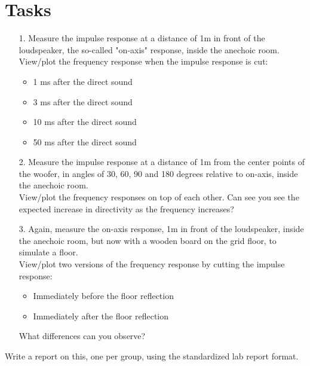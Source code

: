\documentclass{article}
\begin{document}
\section{Tasks}
\begin{itemize}
    \item [1.] Measure the impulse response at a distance of 1m in front of the loudspeaker, the so-called "on-axis" response, inside the anechoic room. \\
	View/plot the frequency response when the impulse response is cut:\\
    \begin{itemize}
	\item 1 ms after the direct sound
	\item 3 ms after the direct sound	
	\item 10 ms after the direct sound	
	\item 50 ms after the direct sound	
	\end{itemize}    
    \item [2.] Measure the impulse response at a distance of 1m from the center points of the woofer, in angles of 30, 60, 90 and 180 degrees relative to on-axis, inside the anechoic room. \\
    View/plot the frequency responses on top of each other. Can see you see the expected increase in directivity as the frequency increases? 
    \item [3.] Again, measure the on-axis response, 1m in front of the loudspeaker, inside the anechoic room, but now with a wooden board on the grid floor, to simulate a floor. \\
    View/plot two versions of the frequency response by cutting the impulse response:\\
    \begin{itemize}
	\item Immediately before the floor reflection
	\item Immediately after the floor reflection	
	\end{itemize}    
	What differences can you observe?
\end{itemize}

Write a  report on this, one per group, using the standardized lab report format.
\end{document}
